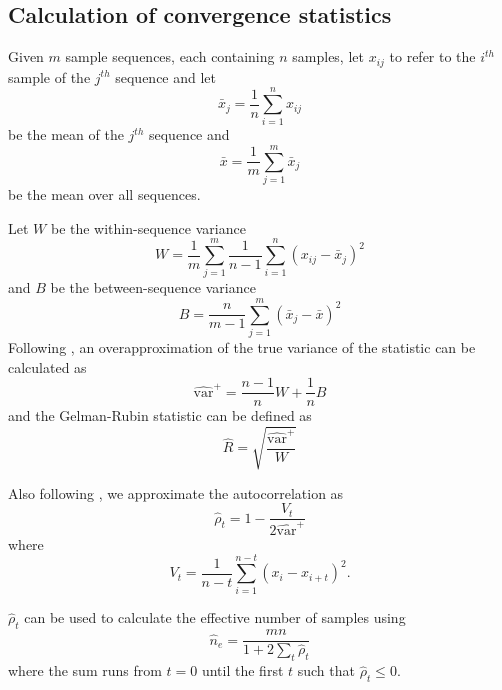 \documentclass{article}
\begin{document}
\begin{appendices} 

\section{Calculation of convergence statistics}
\label{calculatingConvergenceStats}
Given $m$ sample sequences, each containing $n$ samples, let $x_{ij}$ to refer to the $i^{th}$ sample of the $j^{th}$ sequence and let
\[
\bar{x}_j = \frac{1}{n}\sum_{i=1}^n x_{ij}
\]
be the mean of the $j^{th}$ sequence and
\[
\bar{x} = \frac{1}{m}\sum_{j=1}^m \bar{x}_j
\]
be the mean over all sequences.

Let $W$ be the within-sequence variance
\[
W = \frac{1}{m} \sum_{j=1}^m \frac{1}{n-1} \sum_{i=1}^n (x_{ij} - \bar{x}_j)^2
\]
and $B$ be the between-sequence variance
\[
B = \frac{n}{m-1}\sum_{j=1}^m (\bar{x}_j - \bar{x})^2
\]
Following \citet{gelman2013bayesian}, an overapproximation of the true variance of the statistic can be calculated as
\[
\widehat{\text{var}}^+ = \frac{n-1}{n}W + \frac{1}{n}B
\]
and the Gelman-Rubin statistic can be defined as
\[
\hat{R} = \sqrt{\frac{\widehat{\text{var}}^+}{W}}
\]

Also following \citet{gelman2013bayesian}, we approximate the autocorrelation as
\[
\hat{\rho}_t = 1 - \frac{V_t}{2\widehat{\text{var}}^+}
\]
where
\[
V_t = \frac{1}{n-t} \sum_{i=1}^{n-t} (x_i - x_{i+t})^2.
\]

$\hat{\rho}_t$ can be used to calculate the effective number of samples using
\[
\hat{n}_e = \frac{mn}{1 + 2\sum_{t} \hat{\rho}_t}
\]
where the sum runs from $t=0$ until the first $t$ such that $\hat{\rho}_t \le 0$.

\end{appendices}

%
% 


\end{document}
